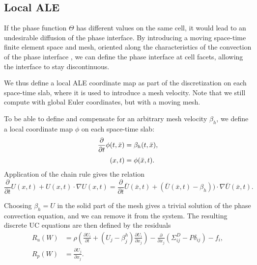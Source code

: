 \subsection{Local ALE}
\label{sec:hoffman-2:ale}

If the phase function $\Theta$ has different values on the same cell,
it would lead to an undesirable diffusion of the phase interface. By
introducing a moving space-time finite element space and mesh,
oriented along the characteristics of the convection of the phase
interface \citep[section concerning ``The characteristic Galerkin
  method'']{ErikssonEstepHansboEtAl1996}, we can define the phase
interface at cell facets, allowing the interface to stay
discontinuous.

We thus define a local ALE coordinate map as part of the
discretization on each space-time slab, where it is used to introduce
a mesh velocity. Note that we still compute with global Euler
coordinates, but with a moving mesh.

To be able to define and compensate for an arbitrary mesh velocity
$\beta_h$, we define a local coordinate map $\phi$ on each space-time
slab:\vspace*{1.5pt}
\begin{equation}
\begin{split}\label{eq:ALEmap}
\frac{\partial}{\partial t} \phi(t, \bar{x}) &= \beta_h(t, \bar{x}),
\\[3pt]
(x, t) &= \phi(\bar{x}, t).
\end{split}\vspace*{1.5pt}
\end{equation}
Application of the chain rule gives the relation\vspace*{1.5pt}
\begin{equation}
  \label{eq:ALE2}
  \frac{\partial}{\partial t} U(x,t) + U(x,t) \cdot \nabla U(x,t) = \frac{\partial}{\partial t} \bar{U}(\bar{x},t) +
  (\bar{U}(\bar{x},t) - \beta_h)) \cdot \nabla \bar{U}(\bar{x},t).
\end{equation}

Choosing $\beta_h = U$ in the solid part of the mesh gives a trivial
solution of the phase convection equation, and we can remove it from
the system. The resulting discrete UC equations are then defined by the residuals
\begin{equation}
  \begin{split}\label{eq:ALE}
    R_u(W) &= \rho\left(\frac{\partial U_i}{\partial t} + (U_j - \beta^h_j) \frac{\partial U_i}{\partial x_j} \right) - \frac{\partial}{\partial x_j} (\Sigma^D_{ij} - P \delta_{ij}) - f_i,
    \\
    R_p(W) &= \frac{\partial U_j}{\partial x_j}.
  \end{split}
\end{equation}

